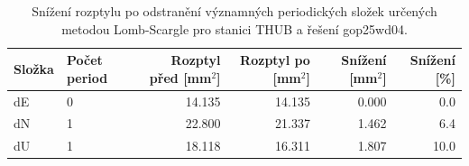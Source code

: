 \begin{table}[htbp]
\caption{Snížení rozptylu po odstranění významných periodických složek určených metodou Lomb-Scargle pro stanici THUB a řešení gop25wd04.}
\label{tab:gop25wd04_stcd_thub_detr_weighted_1seg_spectral_lomb_scargle_variance_reduction}
\begin{tabular}{llrrrr}
\toprule
Složka & Počet period & Rozptyl před [mm$^2$] & Rozptyl po [mm$^2$] & Snížení [mm$^2$] & Snížení [\%] \\
\midrule
dE & 0 & 14.135 & 14.135 & 0.000 & 0.0 \\
dN & 1 & 22.800 & 21.337 & 1.462 & 6.4 \\
dU & 1 & 18.118 & 16.311 & 1.807 & 10.0 \\
\bottomrule
\end{tabular}
\end{table}
